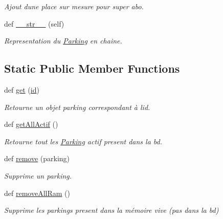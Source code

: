 \begin{DoxyCompactItemize}
\begin{DoxyCompactList}\small\item\em Ajout d\textquotesingle{}une place sur mesure pour super abo. \end{DoxyCompactList}\item 
\hypertarget{classsrc_1_1m_1_1_parking_1_1_parking_aa34c32064d53687335b70fc954ab6558}{}def \hyperlink{classsrc_1_1m_1_1_parking_1_1_parking_aa34c32064d53687335b70fc954ab6558}{\+\_\+\+\_\+str\+\_\+\+\_\+} (self)\label{classsrc_1_1m_1_1_parking_1_1_parking_aa34c32064d53687335b70fc954ab6558}

\begin{DoxyCompactList}\small\item\em Representation du \hyperlink{classsrc_1_1m_1_1_parking_1_1_parking}{Parking} en chaine. \end{DoxyCompactList}\end{DoxyCompactItemize}
\subsection*{Static Public Member Functions}
\begin{DoxyCompactItemize}
\item 
def \hyperlink{classsrc_1_1m_1_1_parking_1_1_parking_adf138642cecd0e948a3ca99f76ef28d4}{get} (\hyperlink{classsrc_1_1m_1_1_parking_1_1_parking_a9da9a365ee1aa296efebb5d256043f65}{id})
\begin{DoxyCompactList}\small\item\em Retourne un objet parking correspondant à l\textquotesingle{}id. \end{DoxyCompactList}\item 
\hypertarget{classsrc_1_1m_1_1_parking_1_1_parking_a20514e00e41f94d3ae50367927196773}{}def \hyperlink{classsrc_1_1m_1_1_parking_1_1_parking_a20514e00e41f94d3ae50367927196773}{get\+All\+Actif} ()\label{classsrc_1_1m_1_1_parking_1_1_parking_a20514e00e41f94d3ae50367927196773}

\begin{DoxyCompactList}\small\item\em Retourne tout les \hyperlink{classsrc_1_1m_1_1_parking_1_1_parking}{Parking} actif present dans la bd. \end{DoxyCompactList}\item 
def \hyperlink{classsrc_1_1m_1_1_parking_1_1_parking_a05def68d66bc3aafe9703cd4f58e7e24}{remove} (parking)
\begin{DoxyCompactList}\small\item\em Supprime un parking. \end{DoxyCompactList}\item 
\hypertarget{classsrc_1_1m_1_1_parking_1_1_parking_a67e60987faa02c102aa53a9aab274bec}{}def \hyperlink{classsrc_1_1m_1_1_parking_1_1_parking_a67e60987faa02c102aa53a9aab274bec}{remove\+All\+Ram} ()\label{classsrc_1_1m_1_1_parking_1_1_parking_a67e60987faa02c102aa53a9aab274bec}

\begin{DoxyCompactList}\small\item\em Supprime les parkings present dans la mémoire vive (pas dans la bd) \end{DoxyCompactList}\end{DoxyCompactItemize}

